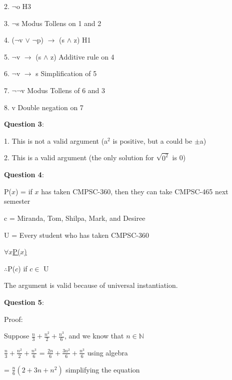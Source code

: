 \documentclass{article} %
\newcommand{\question}[2][]{\begin{flushleft}
        \textbf{Question #1}: \textit{#2}

\end{flushleft}}
\begin{document}
    2. $\neg$o \tabto*{5cm}H3

    3. $\neg$s \tabto*{5cm}Modus Tollens on 1 and 2

    4. ($\neg$v $\lor$ $\neg$p) $\rightarrow$ (s $\land$ z) \tabto*{5cm}H1
    
    5. $\neg$v $\rightarrow$ (s $\land$ z) \tabto*{5cm}Additive rule on 4

    6. $\neg$v $\rightarrow$ s \tabto*{5cm}Simplification of 5

    7. $\neg \neg$v \tabto*{5cm}Modus Tollens of 6 and 3

    8. v \tabto*{5cm}Double negation on 7

    \question[3]{}

    1. This is not a valid argument (a$^2$ is positive, but a could be $\pm$a)
    
    2. This is a valid argument (the only solution for $\sqrt{0^2}$ is 0)

    \question[4]{}

    P($x$) = if $x$ has taken CMPSC-360, then they can take CMPSC-465 next semester

    c = Miranda, Tom, Shilpa, Mark, and Desiree

    U = Every student who has taken CMPSC-360

    \hspace*{0cm}

    \underline{$\forall x$P($x$) \phantom{aaaaaa}}

    $\therefore$P($c$) if $c \in $ U

    \hspace*{0cm}

    The argument is valid because of universal instantiation.

    \newpage




    \question[5]{}


    Proof:

    Suppose $\frac{n}{3} + \frac{n^2}{2} + \frac{n^3}{6}$, and we know that $n \in \mathbb{N}$

    $\frac{n}{3} + \frac{n^2}{2} + \frac{n^3}{6}$ = $\frac{2n}{6} + \frac{3n^2}{6} + \frac{n^3}{6}$ \tabto*{6cm}using algebra
    
    \vspace*{0.08cm}

    \tabto*{2.57cm} = $\frac{n}{6}(2 + 3n + n^2)$ \tabto*{6cm}simplifying the equation
\end{document}
